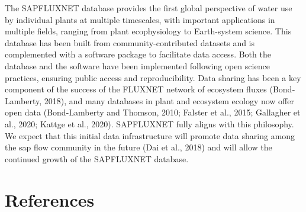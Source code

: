 \documentclass[11pt,twoside]{reedthesis}
\begin{document}
The SAPFLUXNET database provides the first global perspective of water
use by individual plants at multiple timescales, with important
applications in multiple fields, ranging from plant ecophysiology to
Earth-system science. This database has been built from
community-contributed datasets and is complemented with a software
package to facilitate data access. Both the database and the software
have been implemented following open science practices, ensuring public
access and reproducibility. Data sharing has been a key component of the
success of the FLUXNET network of ecosystem fluxes (Bond‐Lamberty,
2018), and many databases in plant and ecosystem ecology now offer open
data (Bond-Lamberty and Thomson, 2010; Falster et al., 2015; Gallagher
et al., 2020; Kattge et al., 2020). SAPFLUXNET fully aligns with this
philosophy. We expect that this initial data infrastructure will promote
data sharing among the sap flow community in the future (Dai et al.,
2018) and will allow the continued growth of the SAPFLUXNET database.

\chapter*{References}\label{references}

\setlength{\parindent}{-0.20in} \setlength{\leftskip}{0.20in}
\setlength{\parskip}{8pt}
\end{document}
